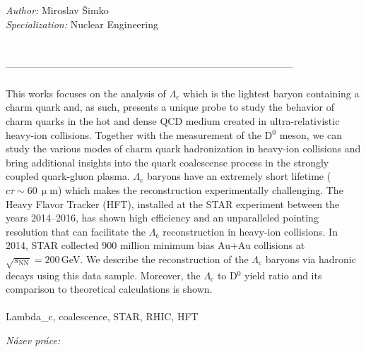\pagestyle{fancy}
\mbox{}
\newpage

\\
{\bf \engtitle}\\

\noindent
{\it Author:}         Miroslav Šimko \\

\noindent
{\it Specialization:}     Nuclear Engineering\\


 \skolitel \\

 \konzultant\\  
--------------------------------------------------------------------------------------- \\

 \\
\noindent  This works focuses on the analysis of $\Lambda_\mathrm{c}$ which is the lightest baryon containing a charm quark and, as such, presents a unique probe to study
the behavior of charm quarks in the hot and dense QCD medium created in ultra-relativistic heavy-ion collisions. Together with the measurement of the D$^0$ meson,
we can study the various modes of charm quark hadronization in heavy-ion collisions and bring additional insights into the  quark coalescense process in the strongly coupled quark-gluon plasma.
$\Lambda_\mathrm{c}$ baryons have an extremely short lifetime ($c \tau \sim 60\,\upmu$m) which makes the reconstruction experimentally challenging. The Heavy Flavor Tracker (HFT), installed at the STAR experiment between the years 2014--2016, has
shown high efficiency and an unparalleled pointing resolution that can facilitate the $\Lambda_\mathrm{c}$ reconstruction  in heavy-ion collisions. In 2014, STAR collected 900 million minimum bias
Au+Au collisions at $\sqrt{s_\mathrm{NN}} = 200\,$GeV\@.
We describe the reconstruction of the $\Lambda_\mathrm{c}$ baryons via hadronic decays using this data sample. Moreover, the $\Lambda_\mathrm{c}$ to D$^0$ yield ratio and its comparison to theoretical calculations is shown.
\\

 \\
\noindent  Lambda\_c, coalescence, STAR, RHIC, HFT

%
 \newpage
 \noindent
{\it N\' azev pr\' ace:}\\
{\bf \czechtitle}\\

